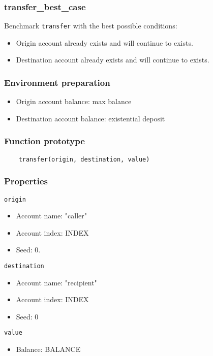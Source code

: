 \documentclass[11pt,a4paper]{article}
\begin{document}
\subsubsection{transfer\_best\_case}

Benchmark \verb|transfer| with the best possible conditions:
\begin{itemize}
\item Origin account already exists and will continue to exists.
\item Destination account already exists and will continue to exists.
\end{itemize}

\subsubsection*{Environment preparation}
\begin{itemize}
\item Origin account balance: max balance
\item Destination account balance: existential deposit
\end{itemize}

\subsubsection*{Function prototype}
\begin{verbatim}
    transfer(origin, destination, value)
\end{verbatim}

\subsubsection*{Properties}
\verb|origin|
\begin{itemize}
\item Account name: "caller"
\item Account index: INDEX
\item Seed: 0.
\end{itemize}
\verb|destination|
\begin{itemize}
\item Account name: "recipient"
\item Account index: INDEX
\item Seed: 0
\end{itemize}
\verb|value|
\begin{itemize}
\item Balance: BALANCE
\end{itemize}
\end{document}
